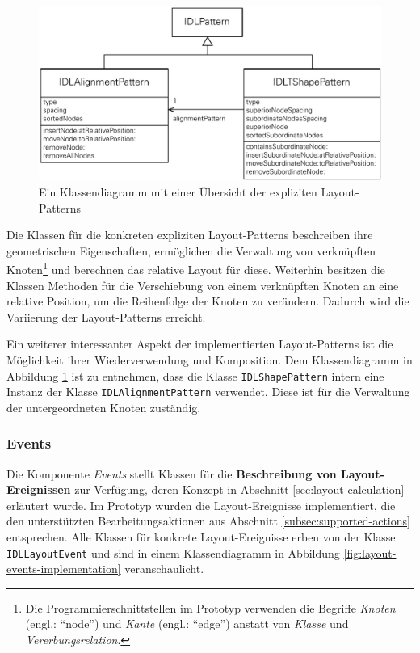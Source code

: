 \begin{figure}[hbt]
    \centering
    \includegraphics[scale=0.8]{assets/layout-patterns-implementation}
    \caption{Ein Klassendiagramm mit einer Übersicht der expliziten Layout-Patterns}
    \label{fig:layout-patterns-implementation}
\end{figure}

Die Klassen für die konkreten expliziten Layout-Patterns beschreiben ihre geometrischen Eigenschaften, ermöglichen die Verwaltung von verknüpften Knoten\footnote{Die Programmierschnittstellen im Prototyp verwenden die Begriffe \textit{Knoten} (engl.: \enquote{node}) und \textit{Kante} (engl.: \enquote{edge}) anstatt von \textit{Klasse} und \textit{Vererbungsrelation}.} und berechnen das relative Layout für diese. Weiterhin besitzen die Klassen Methoden für die Verschiebung von einem verknüpften Knoten an eine relative Position, um die Reihenfolge der Knoten zu verändern. Dadurch wird die Variierung der Layout-Patterns erreicht.

Ein weiterer interessanter Aspekt der implementierten Layout-Patterns ist die Möglichkeit ihrer Wiederverwendung und Komposition. Dem Klassendiagramm in Abbildung \ref{fig:layout-patterns-implementation} ist zu entnehmen, dass die Klasse \texttt{IDLShapePattern} intern eine Instanz der Klasse \texttt{IDLAlignmentPattern} verwendet. Diese ist für die Verwaltung der untergeordneten Knoten zuständig.

\subsubsection{Events}
\label{subsubsec:component-events}

Die Komponente \textit{Events} stellt Klassen für die \textbf{Beschreibung von Layout-Ereignissen} zur Verfügung, deren Konzept in Abschnitt \ref{sec:layout-calculation} erläutert wurde. Im Prototyp wurden die Layout-Ereignisse implementiert, die den unterstützten Bearbeitungsaktionen aus Abschnitt \ref{subsec:supported-actions} entsprechen. Alle Klassen für konkrete Layout-Ereignisse erben von der Klasse \texttt{IDLLayoutEvent} und sind in einem Klassendiagramm in Abbildung \ref{fig:layout-events-implementation} veranschaulicht.

